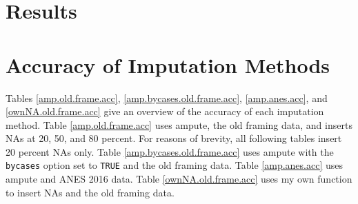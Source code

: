 \documentclass[12pt,econ]{sources/authesis}
\begin{document}
\hypertarget{ordmiss-results}{%
\section{Results}\label{ordmiss-results}}

\hypertarget{ordmiss-results-acc}{%
\section{Accuracy of Imputation Methods}\label{ordmiss-results-acc}}

Tables \ref{amp.old.frame.acc}, \ref{amp.bycases.old.frame.acc}, \ref{amp.anes.acc}, and \ref{ownNA.old.frame.acc} give an overview of the accuracy of each imputation method. Table \ref{amp.old.frame.acc} uses ampute, the old framing data, and inserts NAs at 20, 50, and 80 percent. For reasons of brevity, all following tables insert 20 percent NAs only. Table \ref{amp.bycases.old.frame.acc} uses ampute with the \texttt{bycases} option set to \texttt{TRUE} and the old framing data. Table \ref{amp.anes.acc} uses ampute and ANES 2016 data. Table \ref{ownNA.old.frame.acc} uses my own function to insert NAs and the old framing data.
\end{document}
